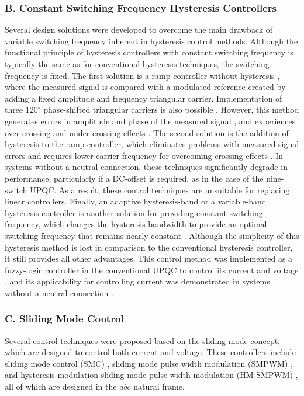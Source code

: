 \subsubsection{B. Constant Switching Frequency Hysteresis Controllers} \vspace*{-0.5cm}
Several design solutions were developed to overcome the main drawback of variable switching frequency inherent in hysteresis control methods. Although the functional principle of hysteresis controllers with constant switching frequency is typically the same as for conventional hysteresis techniques, the switching frequency is fixed. The first solution is a ramp controller without hysteresis \cite{4766477}, where the measured signal is compared with a modulated reference created by adding a fixed amplitude and frequency triangular carrier. Implementation of three $120^{\circ}$ phase-shifted triangular carriers is also possible \cite{605621}. However, this method generates errors in amplitude and phase of the measured signal \cite{605621}, and experiences over-crossing and under-crossing effects \cite{4766477}. The second solution is the addition of hysteresis to the ramp controller, which eliminates problems with measured signal errors and requires lower carrier frequency for overcoming crossing effects \cite{4766477}. In systems without a neutral connection, these techniques significantly degrade in performance, particularly if a DC-offset is required, as in the case of the nine-switch UPQC. As a result, these control techniques are unsuitable for replacing linear controllers. Finally, an adaptive hysteresis-band or a variable-band hysteresis controller is another solution for providing constant switching frequency, which changes the hysteresis bandwidth to provide an optimal switching frequency that remains nearly constant \cite{103436}. Although the simplicity of this hysteresis method is lost in comparison to the conventional hysteresis controller, it still provides all other advantages. This control method was implemented as a fuzzy-logic controller in the conventional UPQC to control its current and voltage \cite{4758382}, and its applicability for controlling current was demonstrated in systems without a neutral connection \cite{6199990}.
\vspace*{-0.8cm}
\subsubsection{C. Sliding Mode Control} \vspace*{-0.5cm}
Several control techniques were proposed based on the sliding mode concept, which are designed to control both current and voltage. These controllers include sliding mode control (SMC) \cite{1489536}, sliding mode pulse width modulation (SMPWM) \cite{4455458}, and hysteresis-modulation sliding mode pulse width modulation (HM-SMPWM) \cite{6563653}, all of which are designed in the $abc$ natural frame.

